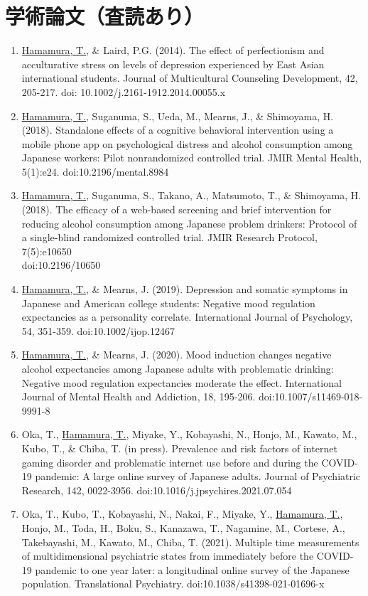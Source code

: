 \documentclass{article}
\begin{document}
\section{学術論文（査読あり）}
\begin{enumerate}
	\item \underline{Hamamura, T.}, \& Laird, P.G. (2014). The effect of perfectionism and acculturative stress on levels of depression experienced by East Asian international students. Journal of Multicultural Counseling Development, 42, 205-217. doi: 10.1002/j.2161-1912.2014.00055.x
	\item \underline{Hamamura, T.}, Suganuma, S., Ueda, M., Mearns, J., \& Shimoyama, H. (2018). Standalone effects of a cognitive behavioral intervention using a mobile phone app on psychological distress and alcohol consumption among Japanese workers: Pilot nonrandomized controlled trial. JMIR Mental Health, 5(1):e24. doi:10.2196/mental.8984
	\item \underline{Hamamura, T.}, Suganuma, S., Takano, A., Matsumoto, T., \& Shimoyama, H. (2018). The efficacy of a web-based screening and brief intervention for reducing alcohol consumption among Japanese problem drinkers: Protocol of a single-blind randomized controlled trial. JMIR Research Protocol, 7(5):e10650\\ doi:10.2196/10650
	\item \underline{Hamamura, T.}, \& Mearns, J. (2019). Depression and somatic symptoms in Japanese and American college students: Negative mood regulation expectancies as a personality correlate. International Journal of Psychology, 54, 351-359. doi:10.1002/ijop.12467
	\item \underline{Hamamura, T.}, \& Mearns, J. (2020). Mood induction changes negative alcohol expectancies among Japanese adults with problematic drinking: Negative mood regulation expectancies moderate the effect. International Journal of Mental Health and Addiction, 18, 195-206. doi:10.1007/s11469-018-9991-8
	\item Oka, T., \underline{Hamamura, T.}, Miyake, Y.,  Kobayashi, N., Honjo, M., Kawato, M., Kubo, T., \& Chiba, T. (in press). Prevalence and risk factors of internet gaming disorder and problematic internet use before and during the COVID-19 pandemic: A large online survey of Japanese adults. Journal of Psychiatric Research, 142, 0022-3956. doi:10.1016/j.jpsychires.2021.07.054
	\item Oka, T., Kubo, T., Kobayashi, N., Nakai, F., Miyake, Y., \underline{Hamamura, T.}, Honjo, M., Toda, H., Boku, S., Kanazawa, T., Nagamine, M.,  Cortese, A., Takebayashi, M., Kawato, M., Chiba, T. (2021). Multiple time measurements of multidimensional psychiatric states from immediately before the COVID-19 pandemic to one year later: a longitudinal online survey of the Japanese population. Translational Psychiatry. doi:10.1038/s41398-021-01696-x

\end{enumerate}
\end{document}
